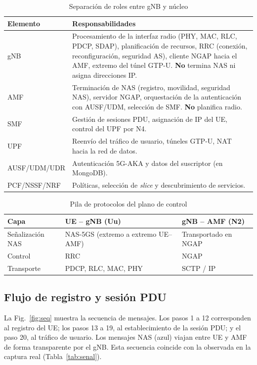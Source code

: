 \documentclass[conference]{IEEEtran}
\begin{document}
\begin{table}[!t]
\caption{Separación de roles entre gNB y núcleo}
\label{tab:roles}
\centering
\footnotesize
\renewcommand{\arraystretch}{1.15}
\begin{tabular}{p{2.6cm}p{5.2cm}}
\toprule
\textbf{Elemento} & \textbf{Responsabilidades} \\
\midrule
gNB & Procesamiento de la interfaz radio (PHY, MAC, RLC, PDCP, SDAP), planificación de recursos, RRC (conexión, reconfiguración, seguridad AS), cliente NGAP hacia el AMF, extremo del túnel GTP-U. \textbf{No} termina NAS ni asigna direcciones IP. \\
AMF & Terminación de NAS (registro, movilidad, seguridad NAS), servidor NGAP, orquestación de la autenticación con AUSF/UDM, selección de SMF. \textbf{No} planifica radio. \\
SMF & Gestión de sesiones PDU, asignación de IP del UE, control del UPF por N4. \\
UPF & Reenvío del tráfico de usuario, túneles GTP-U, NAT hacia la red de datos. \\
AUSF/UDM/UDR & Autenticación 5G-AKA y datos del suscriptor (en MongoDB). \\
PCF/NSSF/NRF & Políticas, selección de \textit{slice} y descubrimiento de servicios. \\
\bottomrule
\end{tabular}
\end{table}

\begin{table}[!t]
\caption{Pila de protocolos del plano de control}
\label{tab:pilas}
\centering
\footnotesize
\renewcommand{\arraystretch}{1.15}
\begin{tabular}{p{1.8cm}p{2.9cm}p{2.9cm}}
\toprule
\textbf{Capa} & \textbf{UE -- gNB (Uu)} & \textbf{gNB -- AMF (N2)} \\
\midrule
Señalización NAS & NAS-5GS (extremo a extremo UE--AMF) & Transportado en NGAP \\
Control & RRC & NGAP \\
Transporte & PDCP, RLC, MAC, PHY & SCTP / IP \\
\bottomrule
\end{tabular}
\end{table}

\subsection{Flujo de registro y sesión PDU}
La Fig.~\ref{fig:seq} muestra la secuencia de mensajes. Los pasos 1 a 12 corresponden al registro del UE; los pasos 13 a 19, al establecimiento de la sesión PDU; y el paso 20, al tráfico de usuario. Los mensajes NAS (azul) viajan entre UE y AMF de forma transparente por el gNB. Esta secuencia coincide con la observada en la captura real (Tabla~\ref{tab:senal}).
\end{document}
